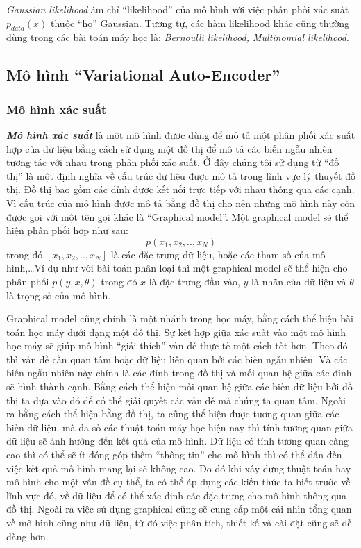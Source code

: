         \textit{Gaussian likelihood} ám chỉ ``likelihood'' của mô hình với việc phân phối xác suất $p_{data}(x)$ thuộc ``họ'' Gaussian.
        Tương tự, các hàm likelihood khác cũng thường dùng trong các bài toán máy học là:
        \textit{Bernoulli likelihood, Multinomial likelihood}.
        
        

        
    


    \subsection{Mô hình ``Variational Auto-Encoder''} 
        \subsubsection{Mô hình xác suất}
        \textbf{\textit{Mô hình xác suất}} là một mô hình được dùng để mô tả một phân 
        phối xác suất hợp của dữ liệu bằng cách sử dụng một đồ thị để mô tả các biến 
        ngẫu nhiên tương tác với nhau trong phân phối xác suất. Ở đây 
        chúng tôi sử dụng từ ``đồ thị'' là một định nghĩa về cấu trúc 
        dữ liệu được mô tả trong lĩnh vực lý thuyết đồ thị. Đồ thị 
        bao gồm các đỉnh được kết nối trực tiếp với nhau thông qua 
        các cạnh. Vì cấu trúc của mô hình đươc mô tả bằng đồ thị cho 
        nên những mô hình này còn được gọi với một tên gọi khác là 
        ``Graphical model''. 
        Một graphical model sẽ thể hiện phân phối hợp như sau:
        $$p(x_1,x_2, .. ,x_N)$$
        trong đó $[x_1,x_2,..,x_N]$ là các đặc trưng dữ liệu, hoặc các tham số của mô hình,\dots Ví dụ như với bài toán phân loại thì một graphical model sẽ thể hiện cho phân phối $p(y,x, \theta)$ trong đó $x$ là đặc trưng đầu vào, $y$ là nhãn của dữ liệu và $\theta$ là trọng số của mô hình. 

        Graphical model cũng chính là một nhánh trong học máy, bằng cách thể hiện bài toán học máy dưới dạng một đồ thị. 
        Sự kết hợp giữa xác suất vào một mô hình học máy sẽ giúp mô hình ``giải thích'' vấn đề thực tế một cách tốt hơn. 
        Theo đó thì vấn đề cần quan tâm hoặc dữ liệu liên quan bởi các biến ngẫu nhiên. Và các biến ngẫu nhiên này chính là các đỉnh trong đồ thị và mối quan hệ giữa các đỉnh sẽ hình thành cạnh. Bằng cách thể hiện mối quan hệ giữa các biến dữ liệu bởi đồ thị ta dựa vào đó để có thể giải quyết các vấn đề mà chúng ta quan tâm. Ngoài ra bằng cách thể hiện bằng đồ thị, ta cũng thể hiện được tương quan giữa các biến dữ liệu, mà đa số các thuật toán máy học hiện nay thì tính tương quan giữa dữ liệu sẽ ảnh hưởng đến kết quả của mô hình. Dữ liệu có tính tương quan càng cao thì có thể sẽ ít đóng góp thêm ``thông tin'' cho mô hình thì có thể dẫn đến việc kết quả mô hình mang lại sẽ không cao. Do đó khi xây dựng thuật toán hay mô hình cho một vấn đề cụ thể, ta có thể áp dụng các kiến thức ta biết trước về lĩnh vực đó, về dữ liệu để có thể xác định các đặc trưng cho mô hình thông qua đồ thị. Ngoài ra việc sử dụng graphical cũng sẽ cung cấp một cái nhìn tổng quan về mô hình cũng như dữ liệu, từ đó việc phân tích, thiết kế và cài đặt cũng sẽ dễ dàng hơn.

